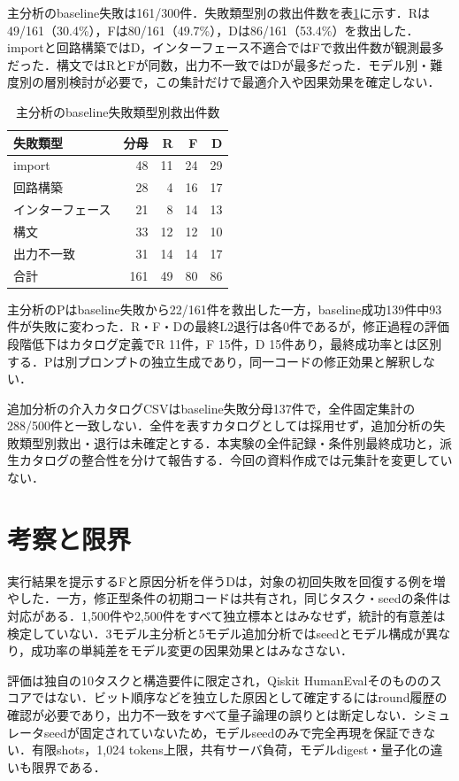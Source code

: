 \documentclass[a4paper,8pt,twocolumn]{extarticle}
\begin{document}
主分析のbaseline失敗は161/300件．失敗類型別の救出件数を表\ref{tab:catalog}に示す．Rは49/161（30.4\%），Fは80/161（49.7\%），Dは86/161（53.4\%）を救出した．importと回路構築ではD，インターフェース不適合ではFで救出件数が観測最多だった．構文ではRとFが同数，出力不一致ではDが最多だった．モデル別・難度別の層別検討が必要で，この集計だけで最適介入や因果効果を確定しない．
\begin{table}[t]
\centering
\caption{主分析のbaseline失敗類型別救出件数}
\label{tab:catalog}
\begin{tabular}{l|r|rrr}
\hline
失敗類型 & 分母 & R & F & D \\
\hline
import & 48 & 11 & 24 & 29 \\
回路構築 & 28 & 4 & 16 & 17 \\
インターフェース & 21 & 8 & 14 & 13 \\
構文 & 33 & 12 & 12 & 10 \\
出力不一致 & 31 & 14 & 14 & 17 \\
\hline
合計 & 161 & 49 & 80 & 86 \\
\hline
\end{tabular}
\end{table}

主分析のPはbaseline失敗から22/161件を救出した一方，baseline成功139件中93件が失敗に変わった．R・F・Dの最終L2退行は各0件であるが，修正過程の評価段階低下はカタログ定義でR 11件，F 15件，D 15件あり，最終成功率とは区別する．Pは別プロンプトの独立生成であり，同一コードの修正効果と解釈しない．

追加分析の介入カタログCSVはbaseline失敗分母137件で，全件固定集計の288/500件と一致しない．全件を表すカタログとしては採用せず，追加分析の失敗類型別救出・退行は未確定とする．本実験の全件記録・条件別最終成功と，派生カタログの整合性を分けて報告する．今回の資料作成では元集計を変更していない．
\section{考察と限界}
実行結果を提示するFと原因分析を伴うDは，対象の初回失敗を回復する例を増やした．一方，修正型条件の初期コードは共有され，同じタスク・seedの条件は対応がある．1,500件や2,500件をすべて独立標本とはみなせず，統計的有意差は検定していない．3モデル主分析と5モデル追加分析ではseedとモデル構成が異なり，成功率の単純差をモデル変更の因果効果とはみなさない．

評価は独自の10タスクと構造要件に限定され，Qiskit HumanEvalそのもののスコアではない．ビット順序などを独立した原因として確定するにはround履歴の確認が必要であり，出力不一致をすべて量子論理の誤りとは断定しない．シミュレータseedが固定されていないため，モデルseedのみで完全再現を保証できない．有限shots，1,024 tokens上限，共有サーバ負荷，モデルdigest・量子化の違いも限界である．
\end{document}
